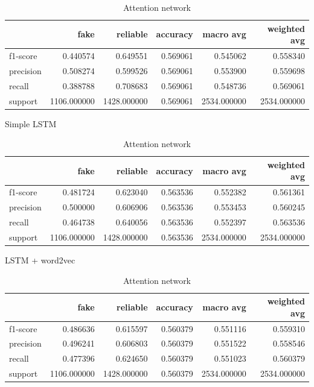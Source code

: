 \begin{table}
\centering
\begin{subtable}{\textwidth}
\begin{tabular}{lrrrrr}
\toprule
{} &         fake &     reliable &  accuracy &    macro avg &  weighted avg \\
\midrule
f1-score  &     0.440574 &     0.649551 &  0.569061 &     0.545062 &      0.558340 \\
precision &     0.508274 &     0.599526 &  0.569061 &     0.553900 &      0.559698 \\
recall    &     0.388788 &     0.708683 &  0.569061 &     0.548736 &      0.569061 \\
support   &  1106.000000 &  1428.000000 &  0.569061 &  2534.000000 &   2534.000000 \\
\bottomrule
\end{tabular}
\caption{Simple LSTM}
\end{subtable}

\begin{subtable}{\textwidth}
	\begin{tabular}{lrrrrr}
	\toprule
	{} &         fake &     reliable &  accuracy &    macro avg &  weighted avg \\
	\midrule
	f1-score  &     0.481724 &     0.623040 &  0.563536 &     0.552382 &      0.561361 \\
	precision &     0.500000 &     0.606906 &  0.563536 &     0.553453 &      0.560245 \\
	recall    &     0.464738 &     0.640056 &  0.563536 &     0.552397 &      0.563536 \\
	support   &  1106.000000 &  1428.000000 &  0.563536 &  2534.000000 &   2534.000000 \\
	\bottomrule
	\end{tabular}
	\caption{LSTM + word2vec}
\end{subtable}

\begin{subtable}{\textwidth}
\begin{tabular}{lrrrrr}
\toprule
{} &         fake &     reliable &  accuracy &    macro avg &  weighted avg \\
\midrule
f1-score  &     0.486636 &     0.615597 &  0.560379 &     0.551116 &      0.559310 \\
precision &     0.496241 &     0.606803 &  0.560379 &     0.551522 &      0.558546 \\
recall    &     0.477396 &     0.624650 &  0.560379 &     0.551023 &      0.560379 \\
support   &  1106.000000 &  1428.000000 &  0.560379 &  2534.000000 &   2534.000000 \\
\bottomrule
\end{tabular}
\caption{Attention network}
\end{subtable}


\end{table}

